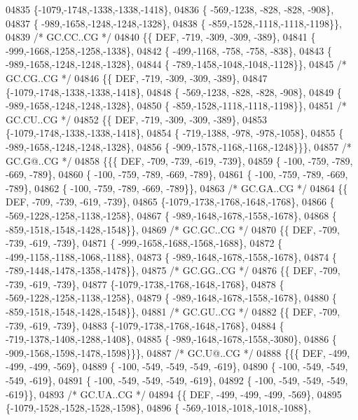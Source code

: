 \begin{DoxyCode}
04835 \{-1079,-1748,-1338,-1338,-1418\},
04836 \{ -569,-1238, -828, -828, -908\},
04837 \{ -989,-1658,-1248,-1248,-1328\},
04838 \{ -859,-1528,-1118,-1118,-1198\}\},
04839 \textcolor{comment}{/* GC.CC..CG */}
04840 \{\{  DEF, -719, -309, -309, -389\},
04841 \{ -999,-1668,-1258,-1258,-1338\},
04842 \{ -499,-1168, -758, -758, -838\},
04843 \{ -989,-1658,-1248,-1248,-1328\},
04844 \{ -789,-1458,-1048,-1048,-1128\}\},
04845 \textcolor{comment}{/* GC.CG..CG */}
04846 \{\{  DEF, -719, -309, -309, -389\},
04847 \{-1079,-1748,-1338,-1338,-1418\},
04848 \{ -569,-1238, -828, -828, -908\},
04849 \{ -989,-1658,-1248,-1248,-1328\},
04850 \{ -859,-1528,-1118,-1118,-1198\}\},
04851 \textcolor{comment}{/* GC.CU..CG */}
04852 \{\{  DEF, -719, -309, -309, -389\},
04853 \{-1079,-1748,-1338,-1338,-1418\},
04854 \{ -719,-1388, -978, -978,-1058\},
04855 \{ -989,-1658,-1248,-1248,-1328\},
04856 \{ -909,-1578,-1168,-1168,-1248\}\}\},
04857 \textcolor{comment}{/* GC.G@..CG */}
04858 \{\{\{  DEF, -709, -739, -619, -739\},
04859 \{ -100, -759, -789, -669, -789\},
04860 \{ -100, -759, -789, -669, -789\},
04861 \{ -100, -759, -789, -669, -789\},
04862 \{ -100, -759, -789, -669, -789\}\},
04863 \textcolor{comment}{/* GC.GA..CG */}
04864 \{\{  DEF, -709, -739, -619, -739\},
04865 \{-1079,-1738,-1768,-1648,-1768\},
04866 \{ -569,-1228,-1258,-1138,-1258\},
04867 \{ -989,-1648,-1678,-1558,-1678\},
04868 \{ -859,-1518,-1548,-1428,-1548\}\},
04869 \textcolor{comment}{/* GC.GC..CG */}
04870 \{\{  DEF, -709, -739, -619, -739\},
04871 \{ -999,-1658,-1688,-1568,-1688\},
04872 \{ -499,-1158,-1188,-1068,-1188\},
04873 \{ -989,-1648,-1678,-1558,-1678\},
04874 \{ -789,-1448,-1478,-1358,-1478\}\},
04875 \textcolor{comment}{/* GC.GG..CG */}
04876 \{\{  DEF, -709, -739, -619, -739\},
04877 \{-1079,-1738,-1768,-1648,-1768\},
04878 \{ -569,-1228,-1258,-1138,-1258\},
04879 \{ -989,-1648,-1678,-1558,-1678\},
04880 \{ -859,-1518,-1548,-1428,-1548\}\},
04881 \textcolor{comment}{/* GC.GU..CG */}
04882 \{\{  DEF, -709, -739, -619, -739\},
04883 \{-1079,-1738,-1768,-1648,-1768\},
04884 \{ -719,-1378,-1408,-1288,-1408\},
04885 \{ -989,-1648,-1678,-1558,-3080\},
04886 \{ -909,-1568,-1598,-1478,-1598\}\}\},
04887 \textcolor{comment}{/* GC.U@..CG */}
04888 \{\{\{  DEF, -499, -499, -499, -569\},
04889 \{ -100, -549, -549, -549, -619\},
04890 \{ -100, -549, -549, -549, -619\},
04891 \{ -100, -549, -549, -549, -619\},
04892 \{ -100, -549, -549, -549, -619\}\},
04893 \textcolor{comment}{/* GC.UA..CG */}
04894 \{\{  DEF, -499, -499, -499, -569\},
04895 \{-1079,-1528,-1528,-1528,-1598\},
04896 \{ -569,-1018,-1018,-1018,-1088\},

\end{DoxyCode}
